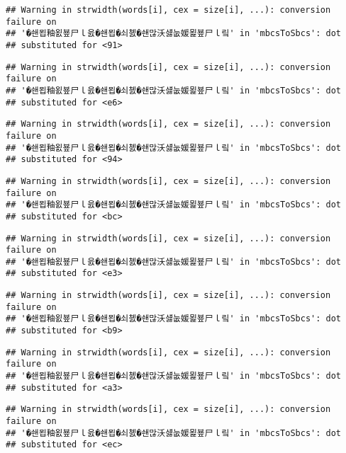 \documentclass[]{article}
\begin{document}
\begin{verbatim}
## Warning in strwidth(words[i], cex = size[i], ...): conversion failure on
## '�쇈묍釉욄뵾尸ｌ읈�쇈묍�쇠쳸�쇈많沃섏눖媛묉뵾尸ｌ맄' in 'mbcsToSbcs': dot
## substituted for <91>
\end{verbatim}

\begin{verbatim}
## Warning in strwidth(words[i], cex = size[i], ...): conversion failure on
## '�쇈묍釉욄뵾尸ｌ읈�쇈묍�쇠쳸�쇈많沃섏눖媛묉뵾尸ｌ맄' in 'mbcsToSbcs': dot
## substituted for <e6>
\end{verbatim}

\begin{verbatim}
## Warning in strwidth(words[i], cex = size[i], ...): conversion failure on
## '�쇈묍釉욄뵾尸ｌ읈�쇈묍�쇠쳸�쇈많沃섏눖媛묉뵾尸ｌ맄' in 'mbcsToSbcs': dot
## substituted for <94>
\end{verbatim}

\begin{verbatim}
## Warning in strwidth(words[i], cex = size[i], ...): conversion failure on
## '�쇈묍釉욄뵾尸ｌ읈�쇈묍�쇠쳸�쇈많沃섏눖媛묉뵾尸ｌ맄' in 'mbcsToSbcs': dot
## substituted for <bc>
\end{verbatim}

\begin{verbatim}
## Warning in strwidth(words[i], cex = size[i], ...): conversion failure on
## '�쇈묍釉욄뵾尸ｌ읈�쇈묍�쇠쳸�쇈많沃섏눖媛묉뵾尸ｌ맄' in 'mbcsToSbcs': dot
## substituted for <e3>
\end{verbatim}

\begin{verbatim}
## Warning in strwidth(words[i], cex = size[i], ...): conversion failure on
## '�쇈묍釉욄뵾尸ｌ읈�쇈묍�쇠쳸�쇈많沃섏눖媛묉뵾尸ｌ맄' in 'mbcsToSbcs': dot
## substituted for <b9>
\end{verbatim}

\begin{verbatim}
## Warning in strwidth(words[i], cex = size[i], ...): conversion failure on
## '�쇈묍釉욄뵾尸ｌ읈�쇈묍�쇠쳸�쇈많沃섏눖媛묉뵾尸ｌ맄' in 'mbcsToSbcs': dot
## substituted for <a3>
\end{verbatim}

\begin{verbatim}
## Warning in strwidth(words[i], cex = size[i], ...): conversion failure on
## '�쇈묍釉욄뵾尸ｌ읈�쇈묍�쇠쳸�쇈많沃섏눖媛묉뵾尸ｌ맄' in 'mbcsToSbcs': dot
## substituted for <ec>
\end{verbatim}
\end{document}
